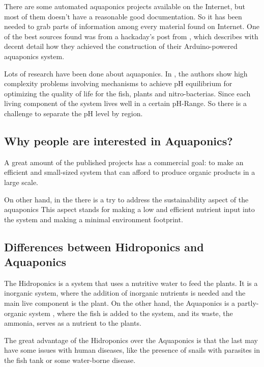 There are some automated aquaponics projects available on the Internet,
but most of them doesn't have a reasonable good documentation.
So it has been needed to grab parts of information among every material found on Internet.
One of the best sources found was from a hackaday's post from \cite{gareth_coleman_aquapionics_2016},
which describes with decent detail how they achieved the construction of their Arduino-powered aquaponics system.

Lots of research have been done about aquaponics.
In \cite{goddek2015challenges}, the authors show high complexity problems involving mechanisms to achieve pH equilibrium for optimizing the quality of life for the fish, plants and nitro-bacterias.
Since each living component of the system lives well in a certain pH-Range.
So there is a challenge to separate the pH level by region.

\subsection{Why people are interested in Aquaponics?}

A great amount of the published projects has a commercial goal:
to make an efficient and small-sized system that can afford to produce organic products in a large scale.

On other hand,
in the \cite{goddek2015challenges} there is a try to address the sustainability aspect of the aquaponics
This aspect stands for making a low and efficient nutrient input into the system and making a minimal environment footprint.

\subsection{Differences between Hidroponics and Aquaponics}

The Hidroponics is a system that uses a nutritive water to feed the plants.
It is a inorganic system, 
where the addition of inorganic nutrients is needed and the main live component is the plant.
On the other hand, the Aquaponics is a partly-organic system \cite{},
where the fish is added to the system,
and its waste,
the ammonia,
serves as a nutrient to the plants.

The great advantage of the Hidroponics over the Aquaponics is that the last may have some issues with human diseases,
like the presence of snails with parasites in the fish tank or some water-borne disease.

